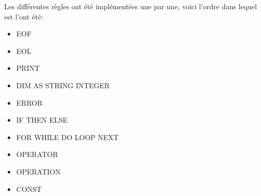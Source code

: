 Les différentes règles ont été implémentées une par une, voici l'ordre dans lequel est l'ont été:
\begin{itemize}
    \item EOF
    \item EOL
    \item PRINT
    \item DIM AS STRING INTEGER
    \item ERROR
    \item IF THEN ELSE
    \item FOR WHILE DO LOOP NEXT
    \item OPERATOR
    \item OPERATION
    \item CONST
\end{itemize}


